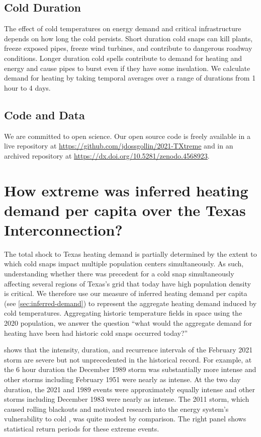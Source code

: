 \documentclass[12pt]{iopart}
\begin{document}
\subsection{Cold Duration}

The effect of cold temperatures on energy demand and critical infrastructure depends on how long the cold persists.
Short duration cold snaps can kill plants, freeze exposed pipes, freeze wind turbines, and contribute to dangerous roadway conditions.
Longer duration cold spells contribute to demand for heating and energy and cause pipes to burst even if they have some insulation.
We calculate demand for heating by taking temporal averages over a range of durations from 1 hour to 4 days.

\subsection{Code and Data}

We are committed to open science.
Our open source code is freely available in a live repository at \url{https://github.com/jdossgollin/2021-TXtreme} and in an archived repository at \url{https://dx.doi.org/10.5281/zenodo.4568923}.

\section{How extreme was inferred heating demand per capita over the Texas Interconnection?}\label{sec:res-agg}

The total shock to Texas heating demand is partially determined by the extent to which cold snaps impact multiple population centers simultaneously.
As such, understanding whether there was precedent for a cold snap simultaneously affecting several regions of Texas's grid that today have high population density is critical.
We therefore use our measure of inferred heating demand per capita (see \cref{sec:inferred-demand}) to represent the aggregate heating demand induced by cold temperatures.
Aggregating historic temperature fields in space using the 2020 population, we answer the question ``what would the aggregate demand for heating have been had historic cold snaps occurred today?''

 shows that the intensity, duration, and recurrence intervals of the February 2021 storm are severe but not unprecedented in the historical record.
For example, at the 6 hour duration the December 1989 storm was substantially more intense and other storms including February 1951 were nearly as intense.
At the two day duration, the 2021 and 1989 events were approximately equally intense and other storms including December 1983 were nearly as intense.
The 2011 storm, which caused rolling blackouts and motivated research into the energy system's vulnerability to cold \cite{ferc_outages:2011}, was quite modest by comparison.
The right panel shows statistical return periods for these extreme events.
\end{document}
